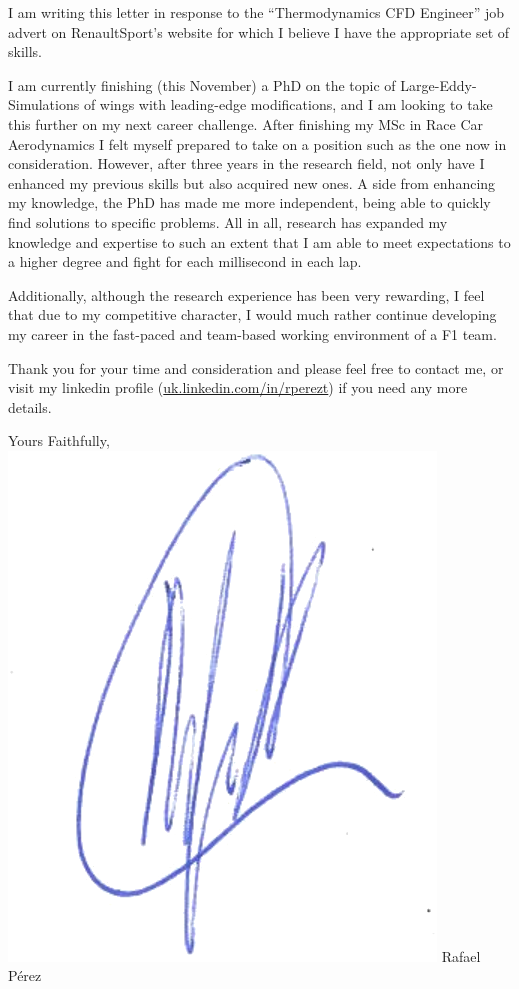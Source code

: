 \documentclass[10pt,stdletter,dateno,sigleft]{newlfm} %
\begin{document}
\begin{newlfm}


I am writing this letter in response to the ``Thermodynamics CFD Engineer'' job advert on
RenaultSport's website for which I believe I have the appropriate set of skills. 

I am currently finishing (this November) a PhD on the topic of Large-Eddy-Simulations of
wings with leading-edge modifications, and I am looking to take this further on my next
career challenge. After finishing my MSc in Race Car Aerodynamics I felt myself prepared to take
on a position such as the one now in consideration. However, after three years in the
research field, not only have I enhanced my previous skills but also acquired new
ones. A side from enhancing my knowledge, the PhD has made me more independent, being able
to quickly find solutions to specific problems. All in all, research has expanded my
knowledge and expertise to such an extent that I am able to meet expectations to a higher
degree and fight for each millisecond in each lap.

Additionally, although the research experience has been very rewarding, I feel that due to
my competitive character, I would much rather continue developing my career in the
fast-paced and team-based working environment of a F1 team.

Thank you for your time and consideration and please feel free to contact me, or visit my
linkedin profile (\href{https://uk.linkedin.com/in/rperezt}{uk.linkedin.com/in/rperezt})
if you need any more details.

Yours Faithfully, \newline %
\includegraphics[scale=0.6]{sgtrBlue} \newline 
Rafael P\'erez


\end{newlfm}
\end{document}
